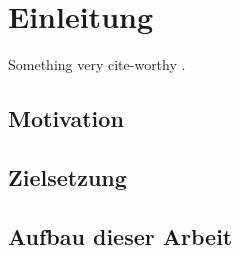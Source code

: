 
\chapter{Einleitung}
\label{sec:introductions}

Something very cite-worthy \cite{apeltauer2015automatic}.

\section{Motivation}
\label{sec:motivation}

\section{Zielsetzung}
\label{sec:goals}

\section{Aufbau dieser Arbeit}
\label{sec:aufbau}
